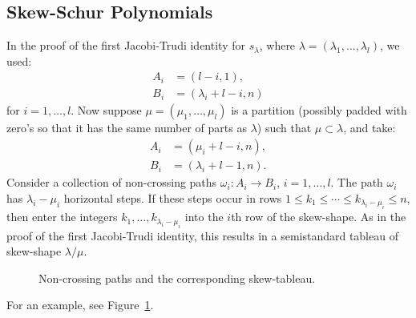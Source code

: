 \documentclass[11pt]{amsproc}
\theoremstyle{definition}
\theoremstyle{example}
\begin{document}
\subsection{Skew-Schur Polynomials}
\label{sec:skew-schur-functions}
In the proof of the first Jacobi-Trudi identity for $s_\lambda$, where $\lambda=(\lambda_1,\dotsc,\lambda_l)$, we used:
\begin{align*}
  A_i & = (l-i, 1),\\
  B_i & = (\lambda_i+l-i, n)
\end{align*}
for $i=1,\dotsc, l$.
Now suppose $\mu = (\mu_1,\dotsc, \mu_l)$ is a partition (possibly padded with zero's so that it has the same number of parts as $\lambda$) such that $\mu\subset \lambda$, and take:
\begin{align*}
  A_i & = (\mu_i+l-i, n),\\
  B_i & = (\lambda_i+l-1, n).
\end{align*}
Consider a collection of non-crossing paths $\omega_i:A_i\to B_i$, $i=1,\dotsc,l$.
The path $\omega_i$ has $\lambda_i-\mu_i$ horizontal steps.
If these steps occur in rows $1\leq k_1\leq \dotsb \leq k_{\lambda_i-\mu_i}\leq n$, then enter the integers $k_1,\dotsc,k_{\lambda_i-\mu_i}$ into the $i$th row of the skew-shape.
As in the proof of the first Jacobi-Trudi identity, this results in a semistandard tableau of skew-shape $\lambda/\mu$.
\begin{figure}[h]
  \centering 
    \hspace{1cm}  
  \caption{Non-crossing paths and the corresponding skew-tableau.}
  \label{fig:skew-jth}
\end{figure}
For an example, see Figure~\ref{fig:skew-jth}.
\end{document}
